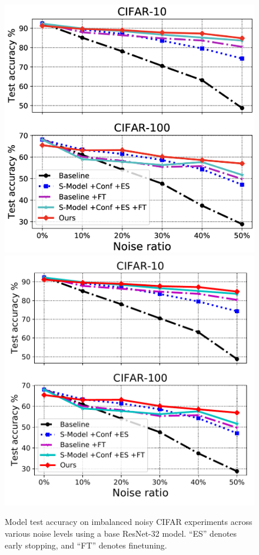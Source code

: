 
\begin{figure}[t]
\centering
\iflatexml
\includegraphics[width=6\columnwidth]{figures/cifar-noisy-imbalance-level.png}
\else
\includegraphics[width=0.9\columnwidth]{figures/cifar-noisy-imbalance-level.pdf}
\fi
\vspace{-0.1in}

\caption{Model test accuracy on imbalanced noisy CIFAR experiments across various noise levels using
a base ResNet-32 model. ``ES'' denotes early stopping, and ``FT'' denotes finetuning.}
\label{fig:level}

\end{figure}
